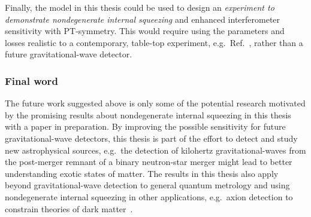 
Finally, the model in this thesis could be used to design an \emph{experiment to demonstrate nondegenerate internal squeezing} and enhanced interferometer sensitivity with PT-symmetry. This would require using the parameters and losses realistic to a contemporary, table-top experiment, e.g.\ Ref.~\cite{sudbeck2020demonstration}, rather than a future gravitational-wave detector.


\subsubsection{Final word}
The future work suggested above is only some of the potential research motivated by the promising results about nondegenerate internal squeezing in this thesis with a paper in preparation.
By improving the possible sensitivity for future gravitational-wave detectors, this thesis is part of the effort to detect and study new astrophysical sources, e.g.\ the detection of kilohertz gravitational-waves from the post-merger remnant of a binary neutron-star merger might lead to better understanding exotic states of matter.
The results in this thesis also apply beyond gravitational-wave detection to general quantum metrology and using nondegenerate internal squeezing in other applications, e.g.\ axion detection to constrain theories of dark matter~\cite{MARSH20161,PhysRevX.9.021023,liBroadbandSensitivityImprovement2020}.


